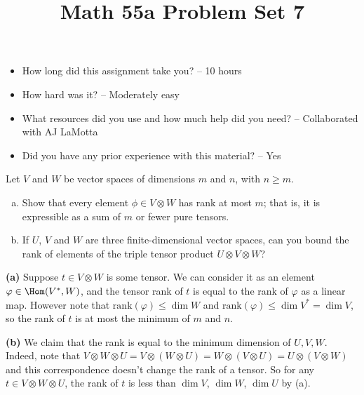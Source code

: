 \documentclass[11pt,letterpaper]{article}
\title{\textbf{Math 55a Problem Set 7}}
\begin{document}
\maketitle
\setcounter{page}{0}
\thispagestyle{empty}

\begin{itemize}
  \item How long did this assignment take you? -- 10 hours
  \item How hard was it? -- Moderately easy
  \item What resources did you use and how much help did you need? -- Collaborated with AJ LaMotta
  \item Did you have any prior experience with this material? -- Yes
\end{itemize}

\pagebreak
\begin{problem}
  Let $V$ and $W$ be vector spaces of dimensions $m$ and $n$, with $n \geq m$. 
  \begin{enumerate}[(a)]
    \item Show that every element $\phi \in V \otimes W$ has rank at most $m$; that is, it is expressible as a sum of $m$ or fewer pure tensors.
    \item If $U$, $V$ and $W$ are three finite-dimensional vector spaces, can you bound the rank of elements of the triple tensor product $U \otimes V \otimes W$?
  \end{enumerate}
\end{problem}

\textbf{(a)} Suppose $t\in V\otimes W$ is some tensor. We can consider it as an element $\varphi \in \Hom(V^*, W)$, and the tensor rank of $t$ is equal to the rank of $\varphi$ as a linear map. However note that $\mathrm{rank}(\varphi)\leq \dim W$ and $\mathrm{rank}(\varphi)\leq \dim V^*=\dim V$, so the rank of $t$ is at most the minimum of $m$ and $n$.

\textbf{(b)} We claim that the rank is equal to the minimum dimension of $U, V, W$. Indeed, note that $V\otimes W\otimes U=V\otimes(W\otimes U)=W\otimes(V\otimes U)=U\otimes(V\otimes W)$ and this correspondence doesn't change the rank of a tensor. So for any $t\in V\otimes W\otimes U$, the rank of $t$ is less than $\dim V$, $\dim W$, $\dim U$ by (a).    
\end{document}
